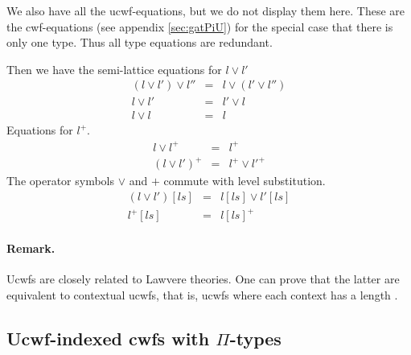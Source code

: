 \documentclass[11pt,a4paper]{article}
\theoremstyle{definition}
\begin{document}
We also have all the ucwf-equations, but we do not display them here. These are the cwf-equations (see appendix   \ref{sec:gatPiU}) for the special case that there is only one type. Thus all type equations are redundant.

Then we have the semi-lattice equations for $l \vee l'$
\begin{eqnarray*}
(l \vee l') \vee l'' &=& l \vee (l' \vee l'')\\
l \vee l' &=& l'\vee l\\
l \vee l &=& l
\end{eqnarray*}
Equations for $l^+$.
\begin{eqnarray*}
l \vee l^+ &=& l^+\\
(l\vee l')^+ &=& l^+\vee l'^+
\end{eqnarray*}
The operator symbols $\vee$ and $+$ commute with level substitution.
\begin{eqnarray*}
(l \vee l')[ls] &=& l[ls] \vee l' [ls]\\
 l^+[ls] &=&  l[ls]^+
\end{eqnarray*}
\paragraph{Remark.} Ucwfs are closely related to Lawvere theories. One can prove that the latter are equivalent to contextual ucwfs, that is, ucwfs where each context has a length \cite{CCD:lambek}.

\subsection{Ucwf-indexed cwfs  with $\Pi$-types}
\end{document}
